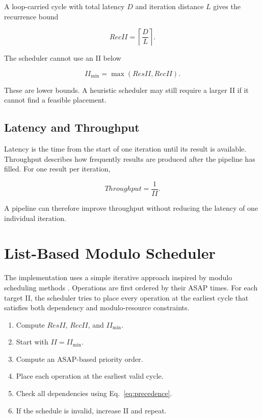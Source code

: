 \documentclass[conference]{IEEEtran}
\begin{document}
A loop-carried cycle with total latency $D$ and iteration distance $L$ gives the
recurrence bound

\begin{equation}
RecII = \left\lceil \frac{D}{L} \right\rceil .
\label{eq:recii}
\end{equation}

The scheduler cannot use an II below

\begin{equation}
II_{\min}=\max(ResII,RecII).
\label{eq:iimin}
\end{equation}

These are lower bounds. A heuristic scheduler may still require a larger II if it
cannot find a feasible placement.

\subsection{Latency and Throughput}

Latency is the time from the start of one iteration until its result is available.
Throughput describes how frequently results are produced after the pipeline has
filled. For one result per iteration,

\begin{equation}
Throughput=\frac{1}{II}.
\label{eq:throughput}
\end{equation}

A pipeline can therefore improve throughput without reducing the latency of one
individual iteration.

\section{List-Based Modulo Scheduler}

The implementation uses a simple iterative approach inspired by modulo scheduling
methods \cite{rau1994,zhang2013}. Operations are first ordered by their ASAP times.
For each target II, the scheduler tries to place every operation at the earliest
cycle that satisfies both dependency and modulo-resource constraints.

\begin{enumerate}
\item Compute $ResII$, $RecII$, and $II_{\min}$.
\item Start with $II=II_{\min}$.
\item Compute an ASAP-based priority order.
\item Place each operation at the earliest valid cycle.
\item Check all dependencies using Eq.~\eqref{eq:precedence}.
\item If the schedule is invalid, increase II and repeat.
\end{enumerate}
\end{document}
